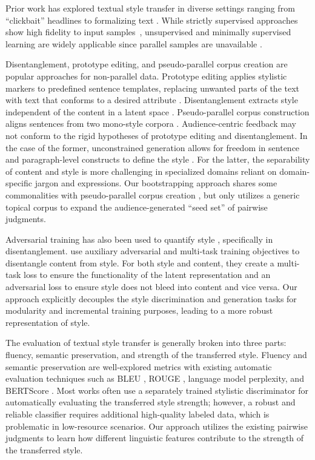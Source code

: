 Prior work has explored textual style transfer in diverse settings ranging from ``clickbait'' headlines to formalizing text \citep{jin2020hooks, chawla-yang-2020-semi, xu2019clickbait}. While strictly supervised approaches show high fidelity to input samples~\citep{hu2017toward, jhamtani-etal-2017-shakespearizing}, unsupervised and minimally supervised learning are widely applicable since parallel samples are unavailable \citep{shen2017style, yang2018unsupervised}.

Disentanglement, prototype editing, and pseudo-parallel corpus creation are popular approaches for non-parallel data. Prototype editing applies stylistic markers to predefined sentence templates, replacing unwanted parts of the text with text that conforms to a desired attribute \citep{guu2018generating, li-etal-2018-delete}. Disentanglement extracts style independent of the content in a latent space \citep{shen2017style, hu-et-al-controllable}. Pseudo-parallel corpus construction aligns sentences from two mono-style corpora \citep{jin-etal-2019-imat, zhang2018style}. Audience-centric feedback may not conform to the rigid hypotheses of prototype editing and disentanglement. In the case of the former, unconstrained generation allows for freedom in sentence and paragraph-level constructs to define the style \citep{li2020}. For the latter, the separability of content and style is more challenging in specialized domains reliant on domain-specific jargon \citep{woodward2008more} and expressions. Our bootstrapping approach shares some commonalities with pseudo-parallel corpus creation \citep{jin-etal-2019-imat, zhang2018style}, but only utilizes a generic topical corpus to expand the audience-generated ``seed set'' of pairwise judgments. 

Adversarial training has also been used to quantify style \citep{yang-2022-adversarial, John2018}, specifically in disentanglement. \citet{John2018} use auxiliary adversarial and multi-task training objectives to disentangle content from style. For both style and content, they create a multi-task loss to ensure the functionality of the latent representation and an adversarial loss to ensure style does not bleed into content and vice versa. Our approach explicitly decouples the style discrimination and generation tasks for modularity and incremental training purposes, leading to a more robust representation of style.

The evaluation of textual style transfer is generally broken into three parts: fluency, semantic preservation, and strength of the transferred style. Fluency and semantic preservation are well-explored metrics with existing automatic evaluation techniques such as BLEU \citep{Papineni2002bleu}, ROUGE \citep{lin-2004-rouge}, language model perplexity, and BERTScore \citep{zhang2019bertscore}. Most works often use a separately trained stylistic discriminator for automatically evaluating the transferred style strength; however, a robust and reliable classifier requires additional high-quality labeled data, which is problematic in low-resource scenarios. Our approach utilizes the existing pairwise judgments to learn how different linguistic features contribute to the strength of the transferred style.

